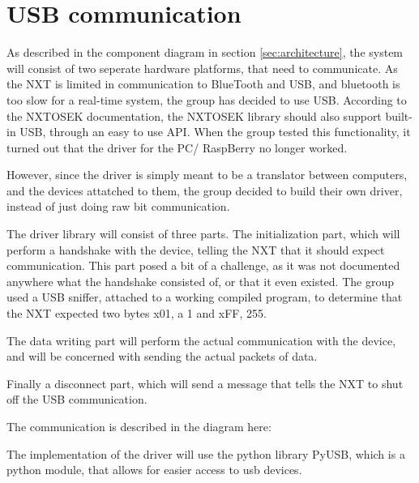 \section{USB communication}
\label{sec:usb}
As described in the component diagram in section \ref{sec:architecture}, the system will consist of two seperate hardware platforms, that need to communicate.
As the NXT is limited in communication to BlueTooth and USB, and bluetooth is too slow for a real-time system, the group has decided to use USB.
According to the NXTOSEK documentation, the NXTOSEK library should also support built-in USB, through an easy to use API.
When the group tested this functionality, it turned out that the driver for the PC/ RaspBerry no longer worked.

However, since the driver is simply meant to be a translator between computers, and the devices attatched to them, the group decided to build their own driver, instead of just doing raw bit communication.

The driver library will consist of three parts.
The initialization part, which will perform a handshake with the device, telling the NXT that it should expect communication.
This part posed a bit of a challenge, as it was not documented anywhere what the handshake consisted of, or that it even existed.
The group used a USB sniffer, attached to a working compiled program, to determine that the NXT expected two bytes x01, a 1 and xFF, 255.

The data writing part will perform the actual communication with the device, and will be concerned with sending the actual packets of data.

Finally a disconnect part, which will send a message that tells the NXT to shut off the USB communication.

The communication is described in the diagram here:


The implementation of the driver will use the python library PyUSB, which is a python module, that allows for easier access to usb devices\cite{PyUSB}.




